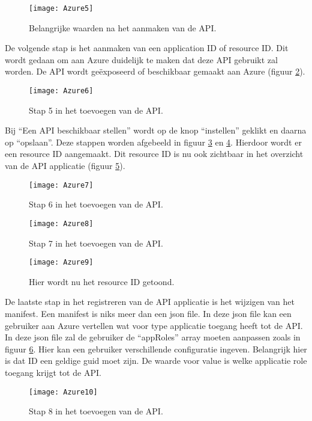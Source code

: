 \begin{figure}[H]
	\centering
	\texttt{[image: Azure5]} 
	\caption[Azure5]{Belangrijke waarden na het aanmaken van de API.}
	\label{fig:azure5}
\end{figure} 
De volgende stap is het aanmaken van een application ID of resource ID. Dit wordt gedaan om aan Azure duidelijk te maken dat deze API gebruikt zal worden. De API wordt geëxposeerd of beschikbaar gemaakt aan Azure (figuur \ref{fig:azure6}).
\begin{figure}[H]
	\centering
	\texttt{[image: Azure6]} 
	\caption[Azure6]{Stap 5 in het toevoegen van de API.}
	\label{fig:azure6}
\end{figure}
Bij “Een API beschikbaar stellen” wordt op de knop “instellen” geklikt en daarna op “opslaan”. Deze stappen worden afgebeeld in figuur \ref{fig:azure7} en \ref{fig:azure8}. Hierdoor wordt er een resource ID aangemaakt. Dit resource ID is nu ook zichtbaar in het overzicht van de API applicatie (figuur \ref{fig:azure9}).
\begin{figure}[H]
	\centering
	\texttt{[image: Azure7]} 
	\caption[Azure7]{Stap 6 in het toevoegen van de API.}
	\label{fig:azure7}
\end{figure}
\begin{figure}[H]
	\centering
	\texttt{[image: Azure8]} 
	\caption[Azure8]{Stap 7 in het toevoegen van de API.}
	\label{fig:azure8}
\end{figure}
\begin{figure}[H]
	\centering
	\texttt{[image: Azure9]} 
	\caption[Azure9]{Hier wordt nu het resource ID getoond.}
	\label{fig:azure9}
\end{figure}\newpage
De laatste stap in het registreren van de API applicatie is het wijzigen van het manifest. Een manifest is niks meer dan een json file. In deze json file kan een gebruiker aan Azure vertellen wat voor type applicatie toegang heeft tot de API. \newline
In deze json file zal de gebruiker de “appRoles” array moeten aanpassen zoals in figuur \ref{fig:azure10}. Hier kan een gebruiker verschillende configuratie ingeven. Belangrijk hier is dat ID een geldige guid moet zijn. De waarde voor value is welke applicatie role toegang krijgt tot de API.
\begin{figure}[H]
	\centering
	\texttt{[image: Azure10]} 
	\caption[Azure10]{Stap 8 in het toevoegen van de API.}
	\label{fig:azure10}
\end{figure}
